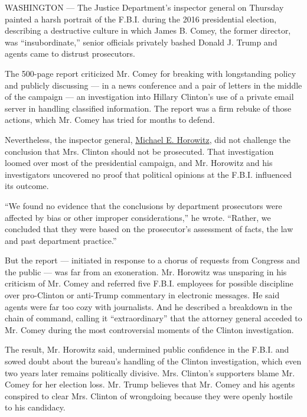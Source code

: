 WASHINGTON --- The Justice Department's inspector general on Thursday
painted a harsh portrait of the F.B.I. during the 2016 presidential
election, describing a destructive culture in which James B. Comey, the
former director, was ``insubordinate,'' senior officials privately
bashed Donald J. Trump and agents came to distrust prosecutors.

The 500-page report criticized Mr. Comey for breaking with longstanding
policy and publicly discussing --- in a news conference and a pair of
letters in the middle of the campaign --- an investigation into Hillary
Clinton's use of a private email server in handling classified
information. The report was a firm rebuke of those actions, which Mr.
Comey has tried for months to defend.

Nevertheless, the inspector general,
\href{https://www.nytimes.com/2018/06/13/us/politics/michael-horowitz-justice-department-inspector-general.html}{Michael
E. Horowitz}, did not challenge the conclusion that Mrs. Clinton should
not be prosecuted. That investigation loomed over most of the
presidential campaign, and Mr. Horowitz and his investigators uncovered
no proof that political opinions at the F.B.I. influenced its outcome.

``We found no evidence that the conclusions by department prosecutors
were affected by bias or other improper considerations,'' he wrote.
``Rather, we concluded that they were based on the prosecutor's
assessment of facts, the law and past department practice.''

But the report --- initiated in response to a chorus of requests from
Congress and the public --- was far from an exoneration. Mr. Horowitz
was unsparing in his criticism of Mr. Comey and referred five F.B.I.
employees for possible discipline over pro-Clinton or anti-Trump
commentary in electronic messages. He said agents were far too cozy with
journalists. And he described a breakdown in the chain of command,
calling it ``extraordinary'' that the attorney general acceded to Mr.
Comey during the most controversial moments of the Clinton
investigation.

The result, Mr. Horowitz said, undermined public confidence in the
F.B.I. and sowed doubt about the bureau's handling of the Clinton
investigation, which even two years later remains politically divisive.
Mrs. Clinton's supporters blame Mr. Comey for her election loss. Mr.
Trump believes that Mr. Comey and his agents conspired to clear Mrs.
Clinton of wrongdoing because they were openly hostile to his candidacy.

